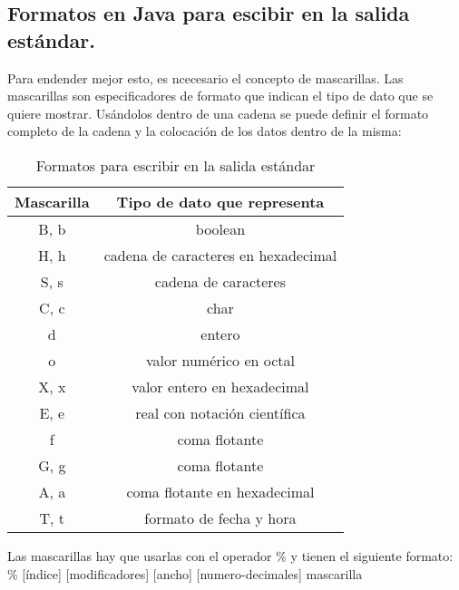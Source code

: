 \subsection{Formatos en Java para escibir en la salida estándar.}Para endender mejor esto, es ncecesario el concepto de mascarillas. Las mascarillas son especificadores de formato que indican el tipo de dato que se quiere mostrar. Usándolos dentro de una cadena se puede definir el formato completo de la cadena y la colocación de los datos dentro de la misma:
\begin{table}[H]
	\centering
	\begin{tabular}{ c | c } 
            Mascarilla & Tipo de dato que representa \\ \hline
		B, b   &  boolean \\ \hline
                  H, h & cadena de caracteres en hexadecimal \\ \hline
                  S, s & cadena de caracteres \\ \hline
                  C, c & char \\ \hline
                     d & entero \\ \hline
                     o & valor numérico en octal \\ \hline 
                  X, x & valor entero en hexadecimal \\ \hline
                  E, e & real con notación científica \\ \hline
                     f & coma flotante \\ \hline
                  G, g & coma flotante \\ \hline
                  A, a & coma flotante en hexadecimal \\ \hline
                  T, t & formato de fecha y hora \\ \hline
	\end{tabular} 
	\caption{Formatos para escribir en la salida estándar} 
\end{table}
Las mascarillas hay que usarlas con el operador \% y tienen el siguiente formato:\\ 
             \% [índice] [modificadores] [ancho] [numero-decimales] mascarilla



